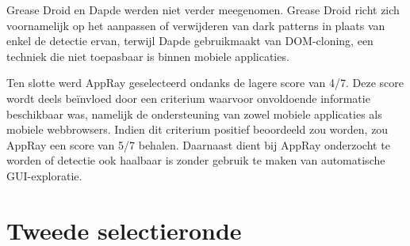 \vspace{1em}

Grease Droid en Dapde werden niet verder meegenomen. Grease Droid richt zich voornamelijk op het aanpassen of verwijderen van dark patterns in plaats van enkel de detectie ervan, terwijl Dapde gebruikmaakt van DOM-cloning, een techniek die niet toepasbaar is binnen mobiele applicaties.

\vspace{1em}

Ten slotte werd AppRay geselecteerd ondanks de lagere score van 4/7. Deze score wordt deels beïnvloed door een criterium waarvoor onvoldoende informatie beschikbaar was, namelijk de ondersteuning van zowel mobiele applicaties als mobiele webbrowsers. Indien dit criterium positief beoordeeld zou worden, zou AppRay een score van 5/7 behalen. Daarnaast dient bij AppRay onderzocht te worden of detectie ook haalbaar is zonder gebruik te maken van automatische GUI-exploratie.

\newpage

\section{Tweede selectieronde}
\label{sec:tweedeselectie}

